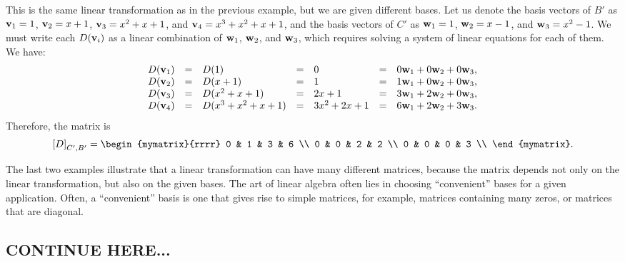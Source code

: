\begin{solution}
  This is the same linear transformation as in the previous example,
  but we are given different bases. Let us denote the basis vectors of
  $B'$ as $\mbox{\bf v}_1 = 1$, $\mbox{\bf v}_2 = x+1$, $\mbox{\bf v}_3 = x^2+x+1$, and
  $\mbox{\bf v}_4=x^3+x^2+x+1$, and the basis vectors of $C'$ as $\mbox{\bf w}_1 = 1$,
  $\mbox{\bf w}_2 = x-1$, and $\mbox{\bf w}_3 = x^2-1$. We must write each
  $D(\mbox{\bf v}_i)$ as a linear combination of $\mbox{\bf w}_1$,
  $\mbox{\bf w}_2$, and $\mbox{\bf w}_3$, which requires solving a system of
  linear equations for each of them. We have:
  \begin{equation*}
    \begin{array}{rclclcl}
      D(\mbox{\bf v}_1) &=& D(1) &=& 0 &=& 0\mbox{\bf w}_1 + 0\mbox{\bf w}_2 + 0\mbox{\bf w}_3, \\
      D(\mbox{\bf v}_2) &=& D(x+1) &=& 1 &=& 1\mbox{\bf w}_1 + 0\mbox{\bf w}_2 + 0\mbox{\bf w}_3, \\
      D(\mbox{\bf v}_3) &=& D(x^2+x+1) &=& 2x+1 &=& 3\mbox{\bf w}_1 + 2\mbox{\bf w}_2 + 0\mbox{\bf w}_3, \\
      D(\mbox{\bf v}_4) &=& D(x^3+x^2+x+1) &=& 3x^2+2x+1 &=& 6\mbox{\bf w}_1 + 2\mbox{\bf w}_2 + 3\mbox{\bf w}_3. \\
    \end{array}
  \end{equation*}
  Therefore, the matrix is
  \begin{equation*}
    \coord{D}_{C',B'} =
    \begin{mymatrix}{rrrr}
      0 & 1 & 3 & 6 \\
      0 & 0 & 2 & 2 \\
      0 & 0 & 0 & 3 \\
    \end{mymatrix}.
  \end{equation*}
\end{solution}

The last two examples illustrate that a linear transformation can have
many different matrices, because the matrix depends not only on the
linear transformation, but also on the given bases. The art of linear
algebra often lies in choosing ``convenient'' bases for a given
application. Often, a ``convenient'' basis is one that gives rise to
simple matrices, for example, matrices containing many zeros, or
matrices that are diagonal.


\subsection{CONTINUE HERE...}

